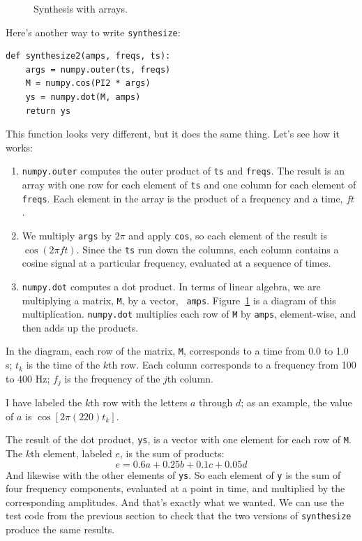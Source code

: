 \documentclass[12pt]{book}
\begin{document}
\begin{figure}

\caption{Synthesis with arrays.}
\label{fig.synthesis}
\end{figure}

Here's another way to write {\tt synthesize}:

\begin{verbatim}
def synthesize2(amps, freqs, ts):
    args = numpy.outer(ts, freqs)
    M = numpy.cos(PI2 * args)
    ys = numpy.dot(M, amps)
    return ys
\end{verbatim}

This function looks very different, but it does the same thing.
Let's see how it works:

\begin{enumerate}

\item {\tt numpy.outer} computes the outer product of {\tt ts} and
  {\tt freqs}.  The result is an array with one row for each element
  of {\tt ts} and one column for each element of {\tt freqs}.  Each
  element in the array is the product of a frequency and a time, $f
  t$.

\item We multiply {\tt args} by $2 \pi$ and apply {\tt cos}, so each
  element of the result is $\cos (2 \pi f t)$.  Since the {\tt ts} run
  down the columns, each column contains a cosine signal at a
  particular frequency, evaluated at a sequence of times.

\item {\tt numpy.dot} computes a dot product.  In terms of linear
  algebra, we are multiplying a matrix, {\tt M}, by a vector, {\tt
    amps}.  Figure~\ref{fig.synthesis} is a diagram of this
  multiplication.  {\tt numpy.dot} multiplies each row of {\tt M} by
  {\tt amps}, element-wise, and then adds up the products.

\end{enumerate}

In the diagram, each row of the matrix, {\tt M}, corresponds to a time 
from 0.0 to 1.0 s; $t_k$ is the time of the $k$th row.
Each column corresponds to a frequency from
100 to 400 Hz; $f_j$ is the frequency of the $j$th column.

I have labeled the $k$th row with the letters $a$ through $d$; as an
example, the value of $a$ is $\cos [2 \pi (220) t_k]$.

The result of the dot product, {\tt ys}, is a vector with one element
for each row of {\tt M}.  The $k$th element, labeled $e$, is the sum
of products:
%
\[ e = 0.6 a + 0.25 b + 0.1 c + 0.05 d \]
%
And likewise with the other elements of {\tt ys}.  So each element
of {\tt y} is the sum of four frequency components, evaluated at
a point in time, and multiplied by the corresponding amplitudes.
And that's exactly what we wanted.  We can use the test code from
the previous section to
check that the two versions of {\tt synthesize} produce the same results.
\end{document}
